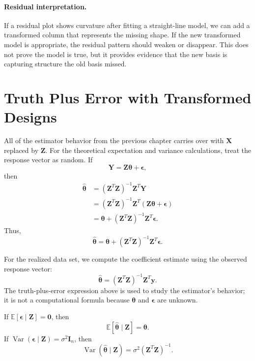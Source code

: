 \paragraph{Residual interpretation.}
If a residual plot shows curvature after fitting a straight-line model, we can add a transformed column that represents the missing shape.  If the new transformed model is appropriate, the residual pattern should weaken or disappear.  This does not prove the model is true, but it provides evidence that the new basis is capturing structure the old basis missed.

\section{Truth Plus Error with Transformed Designs}

All of the estimator behavior from the previous chapter carries over with \(\mathbf{X}\) replaced by \(\mathbf{Z}\).  For the theoretical expectation and variance calculations, treat the response vector as random.  If
\begin{equation}
  \mathbf{Y}=\mathbf{Z}\boldsymbol{\theta}+\boldsymbol{\epsilon},
\end{equation}
then
\begin{align}
  \widehat{\boldsymbol{\theta}}
  &=(\mathbf{Z}^T\mathbf{Z})^{-1}\mathbf{Z}^T\mathbf{Y} \\
  &=(\mathbf{Z}^T\mathbf{Z})^{-1}\mathbf{Z}^T(\mathbf{Z}\boldsymbol{\theta}+\boldsymbol{\epsilon}) \\
  &=\boldsymbol{\theta}+(\mathbf{Z}^T\mathbf{Z})^{-1}\mathbf{Z}^T\boldsymbol{\epsilon}.
\end{align}
Thus,
\begin{equation}
  \boxed{
  \widehat{\boldsymbol{\theta}}
  =\boldsymbol{\theta}+(\mathbf{Z}^T\mathbf{Z})^{-1}\mathbf{Z}^T\boldsymbol{\epsilon}.
  }
\end{equation}

For the realized data set, we compute the coefficient estimate using the observed response vector:
\begin{equation}
  \widehat{\boldsymbol{\theta}}
  =(\mathbf{Z}^T\mathbf{Z})^{-1}\mathbf{Z}^T\mathbf{y}.
\end{equation}
The truth-plus-error expression above is used to study the estimator's behavior; it is not a computational formula because \(\boldsymbol{\theta}\) and \(\boldsymbol{\epsilon}\) are unknown.

If \(\mathbb{E}[\boldsymbol{\epsilon}\mid\mathbf{Z}]=\mathbf{0}\), then
\begin{equation}
  \mathbb{E}[\widehat{\boldsymbol{\theta}}\mid\mathbf{Z}]=\boldsymbol{\theta}.
\end{equation}
If \(\operatorname{Var}(\boldsymbol{\epsilon}\mid\mathbf{Z})=\sigma^2\mathbf{I}_n\), then
\begin{equation}
  \operatorname{Var}(\widehat{\boldsymbol{\theta}}\mid\mathbf{Z})
  =\sigma^2(\mathbf{Z}^T\mathbf{Z})^{-1}.
\end{equation}

